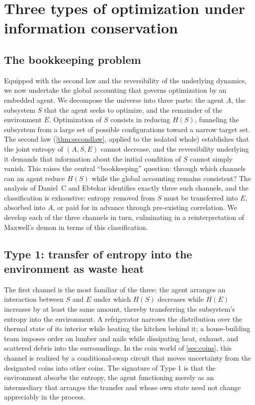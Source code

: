 \documentclass[11pt]{article}
\begin{document}
\section{Three types of optimization under information conservation}
\label{sec:threetypes}

\subsection{The bookkeeping problem}
\label{sec:bookkeeping}

Equipped with the second law and the reversibility of the underlying dynamics, we now undertake the global accounting that governs optimization by an embedded agent. We decompose the universe into three parts: the agent $A$, the subsystem $S$ that the agent seeks to optimize, and the remainder of the environment $E$. Optimization of $S$ consists in reducing $H(S)$, funneling the subsystem from a large set of possible configurations toward a narrow target set. The second law (\cref{thm:secondlaw}, applied to the isolated whole) establishes that the joint entropy of $(A, S, E)$ cannot decrease, and the reversibility underlying it demands that information about the initial condition of $S$ cannot simply vanish. This raises the central ``bookkeeping'' question: through which channels can an agent reduce $H(S)$ while the global accounting remains consistent? The analysis of Daniel~C and Ebtekar identifies exactly three such channels, and the classification is exhaustive: entropy removed from $S$ must be transferred into $E$, absorbed into $A$, or paid for in advance through pre-existing correlation. We develop each of the three channels in turn, culminating in a reinterpretation of Maxwell's demon in terms of this classification.

\subsection{Type 1: transfer of entropy into the environment as waste heat}
\label{sec:type1}

The first channel is the most familiar of the three: the agent arranges an interaction between $S$ and $E$ under which $H(S)$ decreases while $H(E)$ increases by at least the same amount, thereby transferring the subsystem's entropy into the environment. A refrigerator narrows the distribution over the thermal state of its interior while heating the kitchen behind it; a house-building team imposes order on lumber and nails while dissipating heat, exhaust, and scattered debris into the surroundings. In the coin world of \cref{sec:coins}, this channel is realized by a conditional-swap circuit that moves uncertainty from the designated coins into other coins. The signature of Type 1 is that the environment absorbs the entropy, the agent functioning merely as an intermediary that arranges the transfer and whose own state need not change appreciably in the process.
\end{document}

